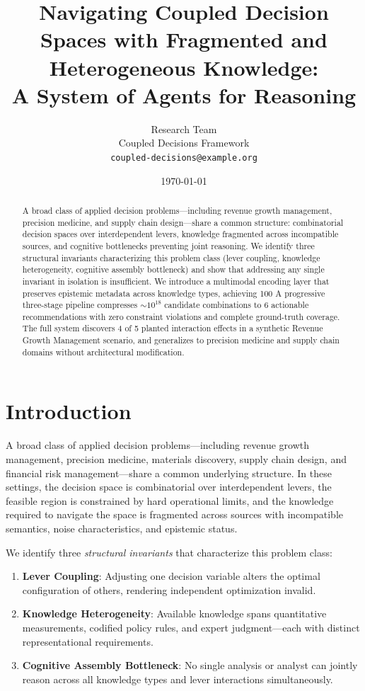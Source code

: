 \documentclass[11pt,a4paper]{article}
\title{Navigating Coupled Decision Spaces with Fragmented and Heterogeneous Knowledge:\\A System of Agents for Reasoning}
\author{%
    Research Team\\
    Coupled Decisions Framework\\
    \texttt{coupled-decisions@example.org}
}
\date{\today}
\begin{document}
\maketitle

\begin{abstract}
A broad class of applied decision problems---including revenue growth management, precision medicine, and supply chain design---share a common structure: combinatorial decision spaces over interdependent levers, knowledge fragmented across incompatible sources, and cognitive bottlenecks preventing joint reasoning.
We identify three structural invariants characterizing this problem class (lever coupling, knowledge heterogeneity, cognitive assembly bottleneck) and show that addressing any single invariant in isolation is insufficient.
We introduce a multimodal encoding layer that preserves epistemic metadata across knowledge types, achieving 100%
A progressive three-stage pipeline compresses ${\sim}10^{18}$ candidate combinations to 6 actionable recommendations with zero constraint violations and complete ground-truth coverage.
The full system discovers 4 of 5 planted interaction effects in a synthetic Revenue Growth Management scenario, and generalizes to precision medicine and supply chain domains without architectural modification.
\end{abstract}


\section{Introduction}
\label{sec:introduction}

A broad class of applied decision problems---including revenue growth management, precision medicine, materials discovery, supply chain design, and financial risk management---share a common underlying structure.
In these settings, the decision space is combinatorial over interdependent levers, the feasible region is constrained by hard operational limits, and the knowledge required to navigate the space is fragmented across sources with incompatible semantics, noise characteristics, and epistemic status.

We identify three \emph{structural invariants} that characterize this problem class:
\begin{enumerate}
    \item \textbf{Lever Coupling}: Adjusting one decision variable alters the optimal configuration of others, rendering independent optimization invalid.
    \item \textbf{Knowledge Heterogeneity}: Available knowledge spans quantitative measurements, codified policy rules, and expert judgment---each with distinct representational requirements.
    \item \textbf{Cognitive Assembly Bottleneck}: No single analysis or analyst can jointly reason across all knowledge types and lever interactions simultaneously.
\end{enumerate}
\end{document}
